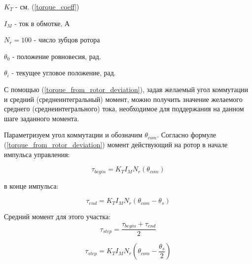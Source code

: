 $K_{T}$ - см. (\ref{torque_coeff})

$I_{M}$ - ток в обмотке, А

$N_{r} = 100$ - число зубцов ротора

$\theta_{0}$ - положение ровновесия, рад.

$\theta_{i}$ - текущее угловое положение, рад.
\newline
\newline

С помощью (\ref{torque_from_rotor_deviation}), задав желаемый угол коммутации и
средний (среднеинтегральный) момент, можно получить значение желаемого среднего
(среднеинтегрального) тока, необходимое для поддержания на данном шаге заданного момента.

Параметризуем угол коммутации и обозначим
$\theta_{com}$.
Согласно формуле (\ref{torque_from_rotor_deviation}) момент действующий на ротор
в начале импульса управления:

\begin{equation}
    \label{moment_to_rotor_at_the_begin_of_control_pulse}    
    \tau_{begin} = K_{T} I_{M} N_{r} ( \theta_{com} )
\end{equation}

в конце импульса:

\begin{equation}
    \label{moment_to_rotor_at_the_end_of_control_pulse}    
    \tau_{end} = K_{T} I_{M} N_{r} ( \theta_{com} - \theta_{s} )
\end{equation}

Средний момент для этого участка:
$$
    \tau_{step} = \frac{ \tau_{begin} + \tau_{end} }{ 2 }
$$

$$
    \tau_{step} = K_{T} I_{M} N_{r} ( \theta_{com} - \frac{ \theta_{s} }{ 2 } )
$$

